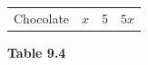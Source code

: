 {\begin{mdframed}[linewidth=4, leftmargin=40, rightmargin=40]
\begin{exercise}
\begin{enumerate}[noitemsep, label=\textbf{Step} \textbf{\arabic*}. ]
{\begin{center}
\begin{xtabular*}{\mytablewidth}[t]{|p{10\mystarwidth}|p{10\mystarwidth}|p{10\mystarwidth}|p{10\mystarwidth}|}
    
        Chocolate &
    
    
        
                  \begin{math}x\end{math}
                 &
    
    
        5 &
    
    
        
                  \begin{math}5x\end{math}
     \tabularnewline{}
    \end{xtabular*}
      \end{center}
    \begin{center}{\small\bfseries Table 9.4}\end{center}
    
    \addtocounter{footnote}{-0}
    
        }%
      
    \par
  

\end{enumerate}
\end{exercise}
\end{mdframed}}
